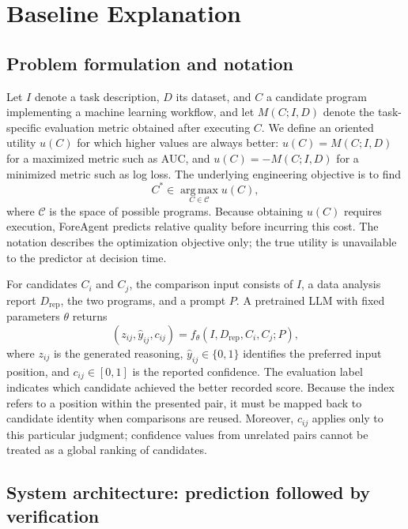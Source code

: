 \documentclass{article}
\begin{document}
\section{Baseline Explanation}

\subsection{Problem formulation and notation}

Let $I$ denote a task description, $D$ its dataset, and $C$ a candidate program implementing a machine learning workflow, and let $M(C;I,D)$ denote the task-specific evaluation metric obtained after executing $C$. We define an oriented utility $u(C)$ for which higher values are always better: $u(C)=M(C;I,D)$ for a maximized metric such as AUC, and $u(C)=-M(C;I,D)$ for a minimized metric such as log loss. The underlying engineering objective is to find
\begin{equation}
  C^* \in \operatorname*{arg\,max}_{C\in\mathcal{C}} u(C),
  \label{eq:objective}
\end{equation}
where $\mathcal{C}$ is the space of possible programs. Because obtaining $u(C)$ requires execution, ForeAgent predicts relative quality before incurring this cost. The notation describes the optimization objective only; the true utility is unavailable to the predictor at decision time.

For candidates $C_i$ and $C_j$, the comparison input consists of $I$, a data analysis report $D_{\mathrm{rep}}$, the two programs, and a prompt $P$. A pretrained LLM with fixed parameters $\theta$ returns
\begin{equation}
  (z_{ij},\widehat{y}_{ij},c_{ij})
  = f_{\theta}(I,D_{\mathrm{rep}},C_i,C_j;P),
  \label{eq:predictor}
\end{equation}
where $z_{ij}$ is the generated reasoning, $\widehat{y}_{ij}\in\{0,1\}$ identifies the preferred input position, and $c_{ij}\in[0,1]$ is the reported confidence. The evaluation label indicates which candidate achieved the better recorded score. Because the index refers to a position within the presented pair, it must be mapped back to candidate identity when comparisons are reused. Moreover, $c_{ij}$ applies only to this particular judgment; confidence values from unrelated pairs cannot be treated as a global ranking of candidates.

\subsection{System architecture: prediction followed by verification}
\end{document}

